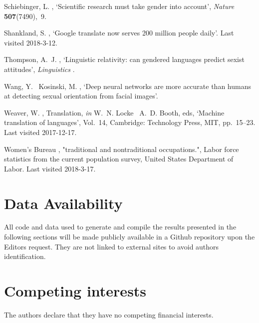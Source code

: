 \documentclass[fleqn,10pt]{article}
\begin{document}
\begin{thebibliography}{xx}
Schiebinger, L.  \harvardyearright , `Scientific research
  must take gender into account', {\em Nature} {\bf 507}(7490),~9.

Shankland, S.  \harvardyearright , `Google translate now
  serves 200 million people daily'.
\newblock Last visited 2018-3-12.
\newline{}

Thompson, A.~J.  \harvardyearright , `Linguistic
  relativity: can gendered languages predict sexist attitudes', {\em
  Linguistics} .

Wang, Y. \harvardand\ Kosinski, M.  \harvardyearright ,
  `Deep neural networks are more accurate than humans at detecting sexual
  orientation from facial images'.

Weaver, W.  \harvardyearright , Translation, {\em in}
  W.~N. Locke \harvardand\ A.~D. Booth, eds, `Machine translation of
  languages', Vol.~14, Cambridge: Technology Press, MIT, pp.~15--23.
\newblock Last visited 2017-12-17.
\newline{}

{Women’s Bureau}  \harvardyearright , "traditional and
  nontraditional occupations.", Labor force statistics from the current
  population survey, United States Department of Labor.
  \newblock Last visited 2018-3-17.
  \newline{}

\end{thebibliography}

\section{Data Availability}
All code and data used to generate and compile the results presented in the following sections will be made publicly available in a Github repository upon the Editors request. They are not linked to external sites to avoid authors identification.

\section{Competing interests}
The authors declare that they have no competing financial interests.
\end{document}
